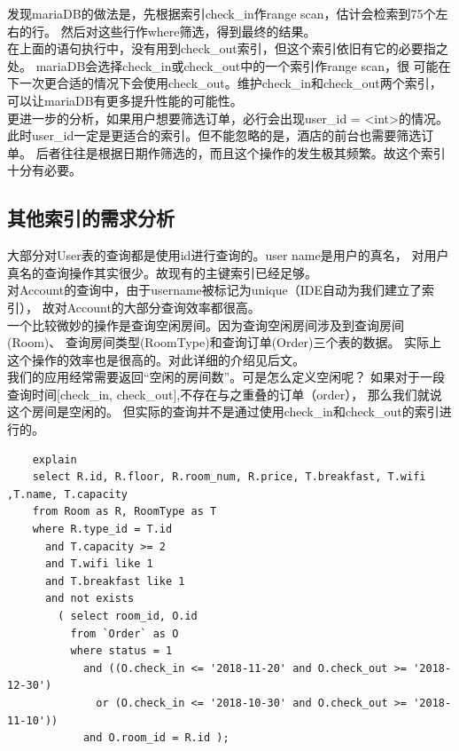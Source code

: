 \documentclass{myreport}
\begin{document}
发现mariaDB的做法是，先根据索引check\_in作range scan，估计会检索到75个左右的行。
然后对这些行作where筛选，得到最终的结果。\\

在上面的语句执行中，没有用到check\_out索引，但这个索引依旧有它的必要指之处。
mariaDB会选择check\_in或check\_out中的一个索引作range scan，很
可能在下一次更合适的情况下会使用check\_out。维护check\_in和check\_out两个索引，
可以让mariaDB有更多提升性能的可能性。\\

更进一步的分析，如果用户想要筛选订单，必行会出现user\_id = <int>的情况。
此时user\_id一定是更适合的索引。但不能忽略的是，酒店的前台也需要筛选订单。
后者往往是根据日期作筛选的，而且这个操作的发生极其频繁。故这个索引十分有必要。\\

\subsection{其他索引的需求分析}
大部分对User表的查询都是使用id进行查询的。user name是用户的真名，
对用户真名的查询操作其实很少。故现有的主键索引已经足够。\\

对Account的查询中，由于username被标记为unique（IDE自动为我们建立了索引），
故对Account的大部分查询效率都很高。\\

一个比较微妙的操作是查询空闲房间。因为查询空闲房间涉及到查询房间(Room)、
查询房间类型(RoomType)和查询订单(Order)三个表的数据。
实际上这个操作的效率也是很高的。对此详细的介绍见后文。\\


我们的应用经常需要返回``空闲的房间数''。可是怎么定义空闲呢？
如果对于一段查询时间[check\_in, check\_out],不存在与之重叠的订单（order），
那么我们就说这个房间是空闲的。
但实际的查询并不是通过使用check\_in和check\_out的索引进行的。\\

\begin{verbatim}
    explain 
    select R.id, R.floor, R.room_num, R.price, T.breakfast, T.wifi ,T.name, T.capacity
    from Room as R, RoomType as T
    where R.type_id = T.id
      and T.capacity >= 2
      and T.wifi like 1
      and T.breakfast like 1
      and not exists
        ( select room_id, O.id
          from `Order` as O
          where status = 1
            and ((O.check_in <= '2018-11-20' and O.check_out >= '2018-12-30')
              or (O.check_in <= '2018-10-30' and O.check_out >= '2018-11-10'))
            and O.room_id = R.id );
\end{verbatim}
\end{document}
